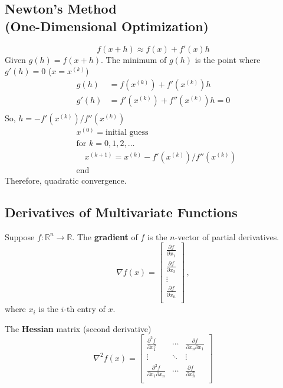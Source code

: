 \documentclass[9pt]{article}
\begin{document}
\begin{multicols}{3}
\hdashrule{\linewidth}{0.5pt}{1mm 1mm}
\vspace{-0.7cm}
\subsection*{Newton's Method\\ \footnotesize{(One-Dimensional Optimization)}}
\[
f(x+h) \approx f(x) + f'(x)h
\]
Given $g(h) = f(x+h)$. The minimum of $g(h)$ is the point where $g'(h) = 0$ ($x = x^{(k)}$)
\[
\begin{aligned}
g(h) &= f(x^{(k)}) + f'(x^{(k)})h\\
g'(h) &= f'(x^{(k)}) + f''(x^{(k)})h = 0\\
\end{aligned}
\]
So, $h = -f'(x^{(k)})/f''(x^{(k)})$
\[
\boxed{
\begin{aligned}
    &x^{(0)} = \text{initial guess}\\
    &\text{for } k = 0, 1, 2, \ldots\\
    & \quad x^{(k+1)} = x^{(k)} -f'(x^{(k)})/f''(x^{(k)})\\
    &\text{end}
\end{aligned}
}
\]
Therefore, quadratic convergence.

\subsection*{\small{Derivatives of Multivariate Functions}}
Suppose $f: \mathbb{R}^n \rightarrow \mathbb{R}$. The \textbf{gradient} of $f$ is the $n$-vector of partial derivatives.
\[
\nabla f(x) =
\begin{bmatrix}
    \frac{\partial f}{\partial x_1}\\
    \frac{\partial f}{\partial x_2}\\
    \vdots \\
    \frac{\partial f}{\partial x_n}\\
\end{bmatrix} \, ,
\]
where $x_i$ is the $i$-th entry of $x$.

\hdashrule{\linewidth}{0.5pt}{0.2mm 1mm}
The \textbf{Hessian} matrix (second derivative) 
\[
\nabla^2f(x) =
\begin{bmatrix}
    \frac{\partial^2 f}{\partial x_1^2} & \cdots & \frac{\partial f}{\partial x_n \partial x_1} \\
    \vdots & \ddots & \vdots \\
    \frac{\partial^2 f}{\partial x_1 \partial x_n} & \cdots & \frac{\partial f}{\partial x_n^2} \\
\end{bmatrix}
\]


\end{multicols}
\end{document}
